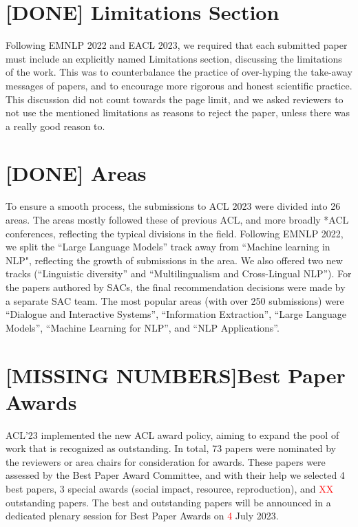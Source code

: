 \section*{[DONE] Limitations Section}

Following EMNLP 2022 and EACL 2023, we required that each submitted paper must include an explicitly named Limitations section, discussing the limitations of the work. This was to counterbalance the practice of over-hyping the take-away messages of papers, and to encourage more rigorous and honest scientific practice. This discussion did not count towards the page limit, and we asked reviewers to not use the mentioned limitations as reasons to reject the paper, unless there was a really good reason to.

\section*{[DONE] Areas}
To ensure a smooth process, the submissions to ACL 2023 were divided into 26 areas. The areas mostly followed these of previous ACL, and more broadly *ACL conferences, reflecting the typical divisions in the field. Following EMNLP 2022, we split the ``Large Language Models'' track away from ``Machine learning in NLP", reflecting the growth of submissions in the area. We also offered two new tracks (``Linguistic diversity'' and ``Multilingualism and Cross-Lingual NLP''). For the papers authored by SACs, the final recommendation decisions were made by a separate SAC team. 
The most popular areas (with over 250 submissions) were ``Dialogue and Interactive Systems'', ``Information Extraction'', ``Large Language Models'', ``Machine Learning for NLP'', and ``NLP Applications''.

\section*{[MISSING NUMBERS]Best Paper Awards}

ACL'23 implemented the new ACL award policy, aiming to expand the pool of work that is recognized as outstanding. In total, 73 papers were nominated by the reviewers or area chairs for consideration for awards. These papers were assessed by the Best Paper Award Committee, and with their help we selected 4 best papers, 3 special awards (social impact, resource, reproduction), and \textcolor{red}{XX} outstanding papers. The best and outstanding papers will be announced in a dedicated plenary session for Best Paper Awards on \textcolor{red}{4} July 2023.

